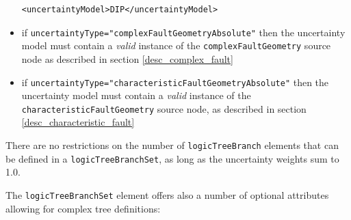 \begin{itemize}
    \begin{verbatim}
<uncertaintyModel>DIP</uncertaintyModel>
	\end{verbatim}

    \item if \Verb+uncertaintyType="complexFaultGeometryAbsolute"+ then the uncertainty model must contain a \emph{valid} instance of the \verb+complexFaultGeometry+ source node as described in section \ref{desc_complex_fault}
    
    \item if \Verb+uncertaintyType="characteristicFaultGeometryAbsolute"+ then the uncertainty model must contain a \emph{valid} instance of the \verb+characteristicFaultGeometry+ source node, as described in section \ref{desc_characteristic_fault}
\end{itemize}

There are no restrictions on the number of \Verb+logicTreeBranch+ elements
that can be defined in a \Verb+logicTreeBranchSet+, as long as the uncertainty
weights sum to 1.0.

The \Verb+logicTreeBranchSet+ element offers also a number of optional
attributes allowing for complex tree definitions:

